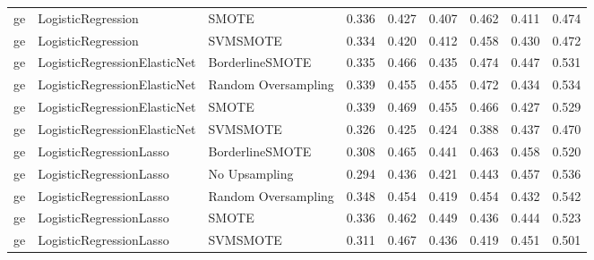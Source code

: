 \begin{tabular}{lllllllll}
      ge &           LogisticRegression &               SMOTE & 0.336 &                     0.427 &                 0.407 &                  0.462 &                                   0.411 &     0.474 \\
      ge &           LogisticRegression &            SVMSMOTE & 0.334 &                     0.420 &                 0.412 &                  0.458 &                                   0.430 &     0.472 \\
      ge & LogisticRegressionElasticNet &     BorderlineSMOTE & 0.335 &                     0.466 &                 0.435 &                  0.474 &                                   0.447 &     0.531 \\
      ge & LogisticRegressionElasticNet & Random Oversampling & 0.339 &                     0.455 &                 0.455 &                  0.472 &                                   0.434 &     0.534 \\
      ge & LogisticRegressionElasticNet &               SMOTE & 0.339 &                     0.469 &                 0.455 &                  0.466 &                                   0.427 &     0.529 \\
      ge & LogisticRegressionElasticNet &            SVMSMOTE & 0.326 &                     0.425 &                 0.424 &                  0.388 &                                   0.437 &     0.470 \\
      ge &      LogisticRegressionLasso &     BorderlineSMOTE & 0.308 &                     0.465 &                 0.441 &                  0.463 &                                   0.458 &     0.520 \\
      ge &      LogisticRegressionLasso &       No Upsampling & 0.294 &                     0.436 &                 0.421 &                  0.443 &                                   0.457 &     0.536 \\
      ge &      LogisticRegressionLasso & Random Oversampling & 0.348 &                     0.454 &                 0.419 &                  0.454 &                                   0.432 &     0.542 \\
      ge &      LogisticRegressionLasso &               SMOTE & 0.336 &                     0.462 &                 0.449 &                  0.436 &                                   0.444 &     0.523 \\
      ge &      LogisticRegressionLasso &            SVMSMOTE & 0.311 &                     0.467 &                 0.436 &                  0.419 &                                   0.451 &     0.501 \\

\end{tabular}
